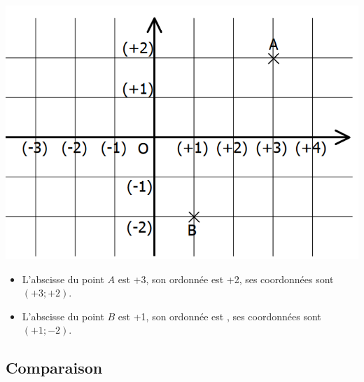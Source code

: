 \documentclass[xcolor={dvipsnames}]{beamer}
\begin{document}
\begin{frame}
	\begin{myex}
		\begin{center}
			\includegraphics[scale=0.4]{repere}
		\end{center}
		
		
		\begin{itemize}
			\item L'abscisse du point $A$ est \pause +3, son ordonnée est \pause +2, ses coordonnées sont \pause $(+3; +2)$. \pause
				
			\item L'abscisse du point $B$ est \pause +1, son ordonnée est , ses coordonnées sont \pause  $(+1; -2)$.
		
		\end{itemize}
	\end{myex}
\end{frame}

\subsection{Comparaison}
\end{document}
